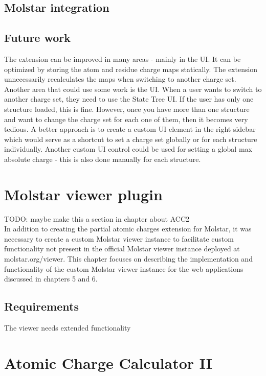 \documentclass[
  digital,     %
  oneside,     %
  nosansbold,  %
  nocolorbold, %
  lof,         %
  lot,         %
]{fithesis4}
\begin{document}
\section{Molstar integration}

\section{Future work}

The extension can be improved in many areas - mainly in the UI. It can be optimized by storing the atom and residue charge maps statically. The extension unnecessarily recalculates the maps when switching to another charge set. Another area that could use some work is the UI. When a user wants to switch to another charge set, they need to use the State Tree UI. If the user has only one structure loaded, this is fine. However, once you have more than one structure and want to change the charge set for each one of them, then it becomes very tedious. A better approach is to create a custom UI element in the right sidebar which would serve as a shortcut to set a charge set globally or for each structure individually. Another custom UI control could be used for setting a global max absolute charge - this is also done manually for each structure.

\chapter{Molstar viewer plugin}

TODO: maybe make this a section in chapter about ACC2 \\

In addition to creating the partial atomic charges extension for Molstar, it was necessary to create a custom Molstar viewer instance to facilitate custom functionality not present in the official Molstar viewer instance deployed at molstar.org/viewer. This chapter focuses on describing the implementation and functionality of the custom Molstar viewer instance for the web applications discussed in chapters 5 and 6.

\section{Requirements}

The viewer needs extended functionality

\chapter{Atomic Charge Calculator II}
\end{document}
